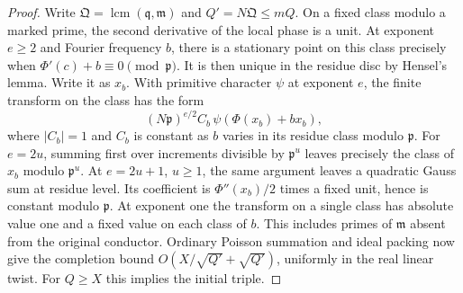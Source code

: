 \documentclass[11pt,letterpaper]{article}
\theoremstyle{definition}
\numberwithin{equation}{section}
\begin{document}
\begin{proof}
Write $\mathfrak Q=\operatorname{lcm}(\mathfrak q,\mathfrak m)$ and
$Q'=N\mathfrak Q\le mQ$. On a fixed class modulo a marked prime,
the second derivative of the local phase is a unit. At exponent
$e\ge2$ and Fourier frequency $b$, there is a stationary point on
this class precisely when $\Phi'(c)+b\equiv0\pmod{\mathfrak p}$.
It is then unique in the residue disc by Hensel's lemma. Write it
as $x_b$. With primitive character $\psi$ at exponent $e$, the
finite transform on the class has the form
\begin{equation}\label{eq:nf-legendre}
 (N\mathfrak p)^{e/2}C_b\,\psi(\Phi(x_b)+b x_b),
\end{equation}
where $|C_b|=1$ and $C_b$ is constant as $b$ varies in its residue
class modulo $\mathfrak p$. For $e=2u$, summing first over
increments divisible by $\mathfrak p^u$ leaves precisely the class
of $x_b$ modulo $\mathfrak p^u$. At $e=2u+1$, $u\ge1$, the same
argument leaves a quadratic Gauss sum at residue level. Its
coefficient is $\Phi''(x_b)/2$ times a fixed unit, hence is constant
modulo $\mathfrak p$. At exponent one the transform on a single
class has absolute value one and a fixed value on each class of
$b$. This includes primes of $\mathfrak m$ absent from the original
conductor. Ordinary Poisson summation and ideal packing now give
the completion bound $O(X/\sqrt {Q'}+\sqrt {Q'})$, uniformly in
the real linear twist. For $Q\ge X$ this implies the initial triple.


\end{proof}
\end{document}
